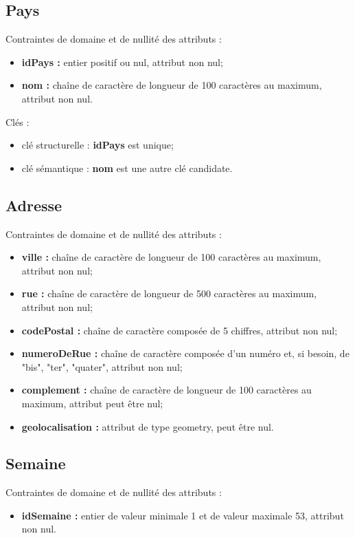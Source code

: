 \documentclass[asi, sansVersion]{picInsa}
\begin{document}
\subsection*{Pays}
Contraintes de domaine et de nullité des attributs :
\begin{itemize}
	\item \textbf{idPays :} entier positif ou nul, attribut non nul;
	\item \textbf{nom :} chaîne de caractère de longueur de 100 caractères au maximum, attribut non nul. \\
\end{itemize}

Clés : 
\begin{itemize}
\item clé structurelle : \textbf{idPays} est unique;
\item clé sémantique : \textbf{nom} est une autre clé candidate. \\ 
\end{itemize}


\subsection*{Adresse}
Contraintes de domaine et de nullité des attributs :
\begin{itemize}
 	\item \textbf{ville :} chaîne de caractère de longueur de 100 caractères au maximum, attribut non nul;
	\item \textbf{rue :} chaîne de caractère de longueur de 500 caractères au maximum, attribut non nul;
	\item \textbf{codePostal :} chaîne de caractère composée de 5 chiffres, attribut non nul;
	\item \textbf{numeroDeRue :} chaîne de caractère composée d'un numéro et, si besoin, de "bis", "ter", "quater", attribut non nul; 
	\item \textbf{complement : } chaîne de caractère de longueur de 100 caractères au maximum, attribut peut être nul;
	\item \textbf{geolocalisation : } attribut de type geometry, peut être nul.\\
\end{itemize}

\subsection*{Semaine}
Contraintes de domaine et de nullité des attributs : 
\begin{itemize}
	\item \textbf{idSemaine :} entier de valeur minimale 1 et de valeur maximale 53, attribut non nul.
\end{itemize}
\end{document}
